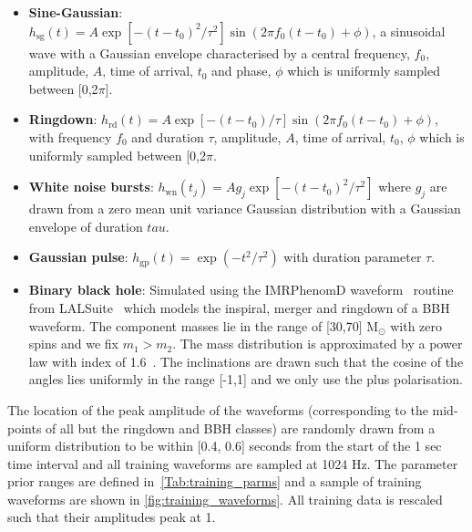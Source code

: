 \documentclass[12pt]{iopart}
\begin{document}
%
\begin{itemize}
%
\item {\bf Sine-Gaussian}: $h_{\text{sg}}(t) = A \exp\left[ - (t-t_{0})^2 /
\tau^2 \right] \sin (2 \pi f_0 (t-t_0) + \phi)$, a sinusoidal wave with a Gaussian
envelope characterised by a central frequency, $f_0$, amplitude, $A$, time of arrival, $t_{0}$ and phase, $\phi$ which is uniformly sampled between [0,2$\pi$]. 
%
\item {\bf Ringdown}: $h_{\text{rd}}(t) = A \exp \left[-{(t-t_0)} / {\tau}
\right] \sin(2 \pi f_0 (t-t_0) + \phi)$, with frequency $f_0$ and duration $\tau$, amplitude, $A$, time of arrival, $t_{0}$, $\phi$ which is uniformly sampled between [0,2$\pi$. 
%
\item {\bf White noise bursts}: $h_{\text{wn}}(t_j) = Ag_j\exp\left[ -
(t-t_{0})^2 / \tau^2 \right]$ where $g_j$ are drawn from a zero mean unit
variance Gaussian distribution with a Gaussian envelope of duration $tau$.
%
\item {\bf Gaussian pulse}: $h_{\text{gp}}(t) = \exp(-t^2 / \tau^2)$ with
duration parameter $\tau$.
%
\item {\bf Binary black hole}: Simulated using the IMRPhenomD
waveform~\cite{Khan_2016} routine from LALSuite~\cite{lalsuite} which models
the inspiral, merger and ringdown of a \ac{BBH} waveform. The component masses
lie in the range of [30,70] $\textrm{M}_{\odot}$ with zero spins and we fix
$m_1>m_2$. The mass distribution is approximated by a power law with
index of 1.6~\cite{Abbott_2019}. The inclinations are drawn
such that the cosine of the angles lies uniformly in the range [-1,1] and we only use the plus polarisation.
%
\end{itemize}
%
The location of the peak amplitude of the waveforms (corresponding to the
mid-points of all but the ringdown and \ac{BBH} classes) are randomly drawn from a uniform distribution to
be within [0.4, 0.6] seconds from the start of the 1 sec time interval and all
training waveforms are sampled at 1024 Hz.  The parameter prior ranges are
defined in~\cref{Tab:training_parms} and a sample of training waveforms are shown in \cref{fig:training_waveforms}. All training data is rescaled such that their amplitudes peak at 1.
\end{document}
